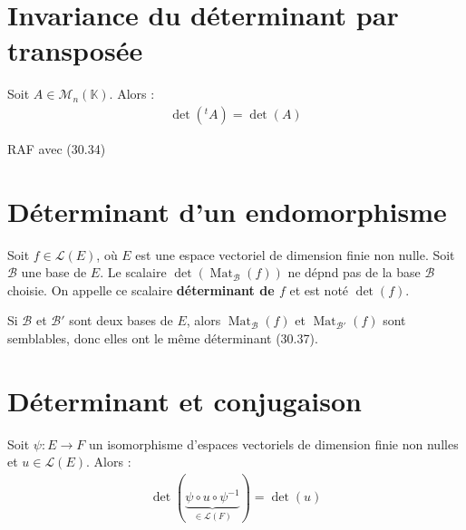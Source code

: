 \documentclass[../main.tex]{subfiles}
\begin{document}
\section{Invariance du déterminant par transposée}
\begin{tcolorbox}[title=Théorème 30.41, title filled=false, colframe=orange, colback=orange!10!white]
    Soit $A\in \mathcal{M}_n(\mathbb{K})$. Alors :
    \begin{align*}
        \operatorname{det}(^tA) = \operatorname{det}(A)
    \end{align*}
\end{tcolorbox}

\noindent RAF avec (30.34)

\section{Déterminant d'un endomorphisme}
\begin{tcolorbox}[title=Théorème 30.42, title filled=false, colframe=orange, colback=orange!10!white]
    Soit $f\in \mathcal{L}(E)$, où $E$ est une espace vectoriel de dimension finie non nulle. Soit $\mathcal{B}$ une base de $E$. Le scalaire $\operatorname{det}(\operatorname{Mat}_{\mathcal{B}}(f))$ ne dépnd pas de la base $\mathcal{B}$ choisie. On appelle ce scalaire \textbf{déterminant de $f$} et est noté $\operatorname{det}(f)$. 
\end{tcolorbox}

\noindent Si $\mathcal{B}$ et $\mathcal{B}'$ sont deux bases de $E$, alors $\operatorname{Mat}_{\mathcal{B}}(f)$ et $\operatorname{Mat}_{\mathcal{B}'}(f)$ sont semblables, donc elles ont le même déterminant (30.37). 

\section{Déterminant et conjugaison}
\begin{tcolorbox}[title=Propostion 30.44, title filled=false, colframe=lightblue, colback=lightblue!10!white]
    Soit $\psi:E\to F$ un isomorphisme d'espaces vectoriels de dimension finie non nulles et $u\in \mathcal{L}(E)$. Alors :
    \begin{align*}
        \operatorname{det}(\underbrace{\psi\circ u\circ \psi^{-1}}_{\in \mathcal{L}(F)}) = \operatorname{det}(u)
    \end{align*}
\end{tcolorbox}
\end{document}
